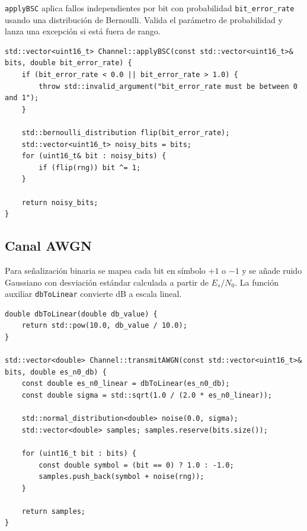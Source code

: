 \texttt{applyBSC} aplica fallos independientes por bit con probabilidad \texttt{bit\_error\_rate} usando una distribución de Bernoulli. Valida el parámetro de probabilidad y lanza una excepción si está fuera de rango.

\begin{lstlisting}[style=CodigoCPP, caption={Implementación del modelo de Canal Simétrico Binario (BSC), invirtiendo bits con una probabilidad dada (\texttt{bit\_error\_rate}).}, label={lst:channel_bsc}]
std::vector<uint16_t> Channel::applyBSC(const std::vector<uint16_t>& bits, double bit_error_rate) {
    if (bit_error_rate < 0.0 || bit_error_rate > 1.0) {
        throw std::invalid_argument("bit_error_rate must be between 0 and 1");
    }

    std::bernoulli_distribution flip(bit_error_rate);
    std::vector<uint16_t> noisy_bits = bits;
    for (uint16_t& bit : noisy_bits) {
        if (flip(rng)) bit ^= 1;
    }

    return noisy_bits;
}
\end{lstlisting}

\subsection{Canal AWGN}

Para señalización binaria se mapea cada bit en símbolo $+1$ o $-1$ y se añade ruido Gaussiano con desviación estándar calculada a partir de \texttt{$E_s/N_0$}. La función auxiliar \texttt{dbToLinear} convierte dB a escala lineal.

\begin{lstlisting}[style=CodigoCPP, caption={Conversión de decibelios a escala lineal y generación de muestras contaminadas con ruido blanco gaussiano aditivo (AWGN).}, label={lst:channel_awgn_transmit}]
double dbToLinear(double db_value) {
    return std::pow(10.0, db_value / 10.0);
}

std::vector<double> Channel::transmitAWGN(const std::vector<uint16_t>& bits, double es_n0_db) {
    const double es_n0_linear = dbToLinear(es_n0_db);
    const double sigma = std::sqrt(1.0 / (2.0 * es_n0_linear));

    std::normal_distribution<double> noise(0.0, sigma);
    std::vector<double> samples; samples.reserve(bits.size());

    for (uint16_t bit : bits) {
        const double symbol = (bit == 0) ? 1.0 : -1.0;
        samples.push_back(symbol + noise(rng));
    }

    return samples;
}
\end{lstlisting}

